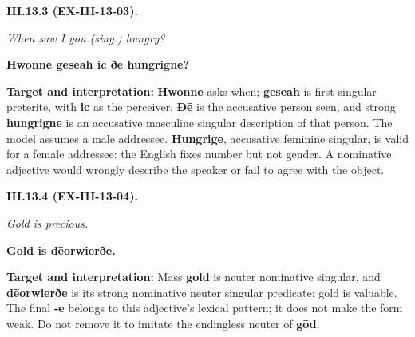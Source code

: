 \par\begin{minipage}{\linewidth}\raggedright
\textbf{III.13.3 (EX-III-13-03).}

\emph{When saw I you (sing.) hungry?}

\textbf{Hwonne geseah ic ðē hungrigne?}

\textbf{Target and interpretation:} \textbf{Hwonne} asks when; \textbf{geseah} is first-singular preterite, with \textbf{ic} as the perceiver. \textbf{Ðē} is the accusative person seen, and strong \textbf{hungrigne} is an accusative masculine singular description of that person. The model assumes a male addressee. \textbf{Hungrige}, accusative feminine singular, is valid for a female addressee: the English fixes number but not gender. A nominative adjective would wrongly describe the speaker or fail to agree with the object.

\end{minipage}\par\addvspace{4pt}

\par\begin{minipage}{\linewidth}\raggedright
\textbf{III.13.4 (EX-III-13-04).}

\emph{Gold is precious.}

\textbf{Gold is dēorwierðe.}

\textbf{Target and interpretation:} Mass \textbf{gold} is neuter nominative singular, and \textbf{dēorwierðe} is its strong nominative neuter singular predicate: gold is valuable. The final \textbf{-e} belongs to this adjective's lexical pattern; it does not make the form weak. Do not remove it to imitate the endingless neuter of \textbf{gōd}.

\end{minipage}\par\addvspace{4pt}

